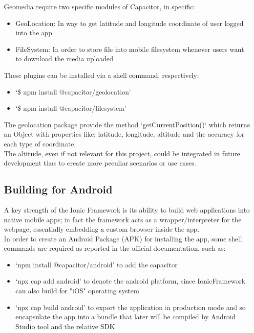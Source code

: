 \documentclass[conference]{IEEEtran}
\begin{document}
Geomedia require two specific modules of Capacitor, in specific:
\begin{itemize}
    \item GeoLocation\cite{b2}: In way to get latitude and longitude coordinate of user logged into the app
    \item FileSystem\cite{b3}: In order to store file into mobile filesystem whenever users want to download the media uploaded
\end{itemize}

These plugins can be installed via a shell command, respectively:
\begin{itemize}
    \item `\$ npm install @capacitor/geolocation'
    \item `\$ npm install @capacitor/filesystem'
\end{itemize}

The geolocation package provide the method `getCurrentPosition()` which returns an Object with properties like: latitude, longitude, altitude and the accuracy for each type of coordinate. 
\\
The altitude, even if not relevant for this project, could be integrated in future development thus to create more peculiar scenarios or use cases.


\subsection{Building for Android}

A key strength of the Ionic Framework is its ability to build web applications into native mobile apps; in fact the framework acts as a wrapper/interpreter for the webpage, essentially embedding a custom browser inside the app.
\\
In order to create an Android Package (APK) for installing the app, some shell commands are required as reported in the official documentation, such as:
\begin{itemize}
    \item `npm install @capacitor/android' to add the capacitor
    \item  `npx cap add android' to denote the android platform, since IonicFramework can also build for "iOS" operating system
    \item `npx cap build android' to export the application in production mode and so encapsulate the app into a bundle that later will be compiled by Android Studio\cite{b11} tool and the relative SDK 
\end{itemize}
\end{document}
